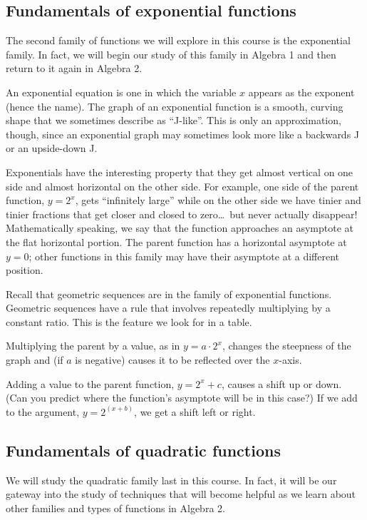 \subsection{Fundamentals of exponential functions}

The second family of functions we will explore in this course is the exponential family. In fact, we will begin our study of this family in Algebra 1 and then return to it again in Algebra 2.

An exponential equation is one in which the variable $x$ appears as the exponent (hence the name). The graph of an exponential function is a smooth, curving shape that we sometimes describe as ``J-like''. This is only an approximation, though, since an exponential graph may sometimes look more like a backwards J or an upside-down J.

Exponentials have the interesting property that they get almost vertical on one side and almost horizontal on the other side. For example, one side of the parent function, $y=2^x$, gets ``infinitely large'' while on the other side we have tinier and tinier fractions that get closer and closed to zero\ldots\ but never actually disappear! Mathematically speaking, we say that the function approaches an \gls{asymptote} at the flat horizontal portion. The parent function has a horizontal asymptote at $y=0$; other functions in this family may have their asymptote at a different position.

Recall that geometric sequences are in the family of exponential functions. Geometric sequences have a rule that involves repeatedly multiplying by a constant ratio. This is the feature we look for in a table.

Multiplying the parent by a value, as in $y=a\cdot2^x$, changes the steepness of the graph and (if $a$ is negative) causes it to be reflected over the $x$-axis.

Adding a value to the parent function, $y=2^x+c$, causes a shift up or down. (Can you predict where the function's asymptote will be in this case?) If we add to the argument, $y = 2^{(x+b)}$, we get a shift left or right.


\subsection{Fundamentals of quadratic functions}

We will study the quadratic family last in this course. In fact, it will be our gateway into the study of techniques that will become helpful as we learn about other families and types of functions in Algebra 2.

